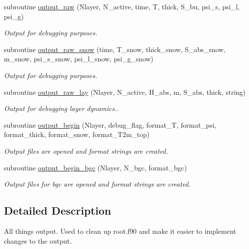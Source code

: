 \begin{DoxyCompactItemize}
subroutine \hyperlink{namespacemo__output_ab7532889e9a83e66ff86ec9fee17cb04}{output\_\-raw} (Nlayer, N\_\-active, time, T, thick, S\_\-bu, psi\_\-s, psi\_\-l, psi\_\-g)
\begin{DoxyCompactList}\small\item\em Output for debugging purposes. \item\end{DoxyCompactList}\item 
subroutine \hyperlink{namespacemo__output_a37683998f084e7c52ae0118b84287f89}{output\_\-raw\_\-snow} (time, T\_\-snow, thick\_\-snow, S\_\-abs\_\-snow, m\_\-snow, psi\_\-s\_\-snow, psi\_\-l\_\-snow, psi\_\-g\_\-snow)
\begin{DoxyCompactList}\small\item\em Output for debugging purposes. \item\end{DoxyCompactList}\item 
subroutine \hyperlink{namespacemo__output_a5da23754959960287613e8c86a436fff}{output\_\-raw\_\-lay} (Nlayer, N\_\-active, H\_\-abs, m, S\_\-abs, thick, string)
\begin{DoxyCompactList}\small\item\em Output for debugging layer dynamics.. \item\end{DoxyCompactList}\item 
subroutine \hyperlink{namespacemo__output_a2075c870541a3bedcb1478870b200b68}{output\_\-begin} (Nlayer, debug\_\-flag, format\_\-T, format\_\-psi, format\_\-thick, format\_\-snow, format\_\-T2m\_\-top)
\begin{DoxyCompactList}\small\item\em Output files are opened and format strings are created. \item\end{DoxyCompactList}\item 
subroutine \hyperlink{namespacemo__output_a6177b5354dfaf78271d92aadef24b94f}{output\_\-begin\_\-bgc} (Nlayer, N\_\-bgc, format\_\-bgc)
\begin{DoxyCompactList}\small\item\em Output files for bgc are opened and format strings are created. \item\end{DoxyCompactList}\end{DoxyCompactItemize}


\subsection{Detailed Description}
All things output. Used to clean up root.f90 and make it easier to implement changes to the output.

